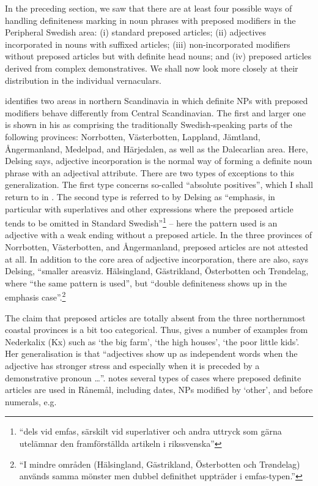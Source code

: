 In the preceding section, we saw that there are at least four possible ways of handling definiteness marking in noun phrases with preposed modifiers in the Peripheral Swedish area: (i) standard preposed articles; (ii) adjectives incorporated in nouns with suffixed articles; (iii) non-incorporated modifiers without preposed articles but with definite head nouns; and (iv) preposed articles derived from complex demonstratives.  We shall now look more closely at their distribution in the individual vernaculars. 

\citet[49]{Delsing2003a} identifies two areas in northern Scandinavia in which definite NPs with preposed modifiers behave differently from Central Scandinavian. The first and larger one is shown in his  as comprising the traditionally Swedish-speaking parts of the following provinces: Norrbotten, Västerbotten, Lappland, Jämtland, Ångermanland, Medelpad, and Härjedalen, as well as the Dalecarlian area. Here, Delsing says, adjective incorporation is the normal way of forming a definite noun phrase with an adjectival attribute. There are two types of exceptions to this generalization. The first type concerns so-called “absolute positives”, which I shall return to in . The second type is referred to by Delsing as “emphasis, in particular with superlatives and other expressions where the preposed article tends to be omitted in Standard Swedish”\footnote{ “dels vid emfas, särskilt vid superlativer och andra uttryck som gärna utelämnar den framförställda artikeln i rikssvenska” } – here the pattern used is an adjective with a weak ending without a preposed article. In the three provinces of Norrbotten, Västerbotten, and Ångermanland, preposed articles are not attested at all. In addition to the core area of adjective incorporation, there are also, says Delsing, “smaller areasviz. Hälsingland, Gästrikland, Österbotten och Trøndelag, where “the same pattern is used”, but “double definiteness shows up in the emphasis case”.\footnote{ “I mindre områden (Hälsingland, Gästrikland, Österbotten och Trøndelag) används samma mönster men dubbel definithet uppträder i emfas-typen.”}

The claim that preposed articles are totally absent from the three northernmost coastal provinces is a bit too categorical. Thus, \citet[141]{Rutberg1924} gives a number of examples from Nederkalix (Kx) such as ‘the big farm’, ‘the high houses’, ‘the poor little kids’. Her generalisation is that “adjectives show up as independent words when the adjective has stronger stress and especially when it is preceded by a demonstrative pronoun …”. \citet[114]{Wikberg2004} notes several types of cases where preposed definite articles are used in Rånemål, including dates, NPs modified by  ‘other’, and before numerals, e.g.

